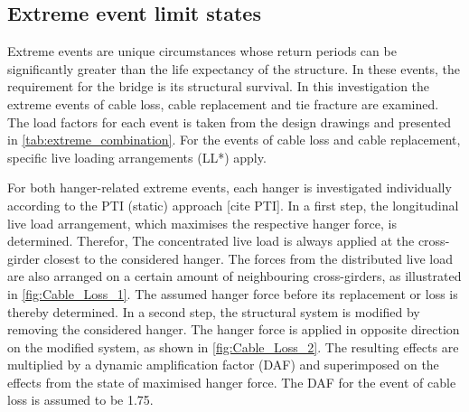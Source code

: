 \subsection{Extreme event limit states}
Extreme events are unique circumstances whose return periods can be significantly greater than the life expectancy of the structure. In these events, the requirement for the bridge is its structural survival. In this investigation the extreme events of cable loss, cable replacement and tie fracture are examined. The load factors for each event is taken from the design drawings and presented in \cref{tab:extreme_combination}. For the events of cable loss and cable replacement, specific live loading arrangements (LL*) apply.



For both hanger-related extreme events, each hanger is investigated individually according to the PTI (static) approach [cite PTI]. In a first step, the longitudinal live load arrangement, which maximises the respective hanger force, is determined. Therefor, The concentrated live load is always applied at the cross-girder closest to the considered hanger. The forces from the distributed live load are also arranged on a certain amount of neighbouring cross-girders, as illustrated in \cref{fig:Cable_Loss_1}. The assumed hanger force before its replacement or loss is thereby determined. In a second step, the structural system is modified by removing the considered hanger. The hanger force is applied in opposite direction on the modified system, as shown in \cref{fig:Cable_Loss_2}. The resulting effects are multiplied by a dynamic amplification factor (DAF) and superimposed on the effects from the state of maximised hanger force. The DAF for the event of cable loss is assumed to be 1.75.

